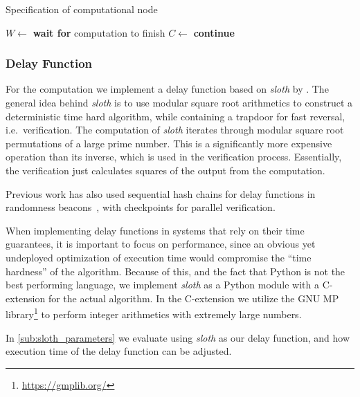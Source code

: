 \begin{algorithm}[tb]
\caption{Specification of computational node}
\label{lst:comp_node}
\begin{algorithmic}[1]
    \State {}
\EndProcedure
{}
    \Repeat
        \State {}
            \State $W \gets $  
                \State {}
                \State {}
                \State {}
                \State \textbf{wait for} computation to finish
                \State $C \gets $ 
                \State {}
            \Else
                \State {}
            \EndIf
        \Else
            \State \textbf{continue}
        \EndIf
\EndProcedure
\end{algorithmic}
\end{algorithm}

\subsubsection{Delay Function}%
\label{ssub:delay_function}
For the computation we implement a delay function based on \textit{sloth} by \citet{randomzoo}.
The general idea behind \textit{sloth} is to use modular square root arithmetics to construct a deterministic time hard algorithm, while containing a trapdoor for fast reversal, i.e.\ verification.
The computation of \textit{sloth} iterates through modular square root permutations of a large prime number.
This is a significantly more expensive operation than its inverse, which is used in the verification process.
Essentially, the verification just calculates squares of the output from the computation.

Previous work has also used sequential hash chains for delay functions in randomness beacons~\cite{bunz2017proofsof}, with checkpoints for parallel verification.

When implementing delay functions in systems that rely on their time guarantees, it is important to focus on performance, since an obvious yet undeployed optimization of execution time would compromise the \enquote{time hardness} of the algorithm.
Because of this, and the fact that Python is not the best performing language, we implement \textit{sloth} as a Python module with a C-extension for the actual algorithm.
In the C-extension we utilize the GNU MP library\footnote{\url{https://gmplib.org/}} to perform integer arithmetics with extremely large numbers.

In \vref{sub:sloth_parameters} we evaluate using \textit{sloth} as our delay function, and how execution time of the delay function can be adjusted.

